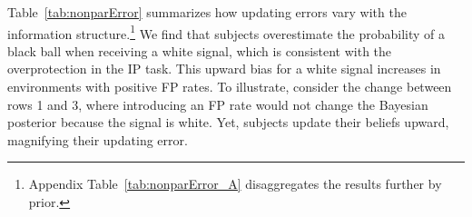 \documentclass[12pt,a4paper]{article}
\begin{document}
\begin{table}[H]\centering 
\caption{Average Updating Error by Signal Type} 
\label{tab:nonparError}
\end{table}



Table~\ref{tab:nonparError} summarizes how updating errors vary with the information structure.\footnote{Appendix Table~\ref{tab:nonparError_A} disaggregates the results further by prior.} We find that subjects overestimate the probability of a black ball when receiving a white signal, which is consistent with the overprotection in the IP task. This upward bias for a white signal increases in environments with positive FP rates. To illustrate, consider the change between rows 1 and 3, where introducing an FP rate would not change the Bayesian posterior because the signal is white. Yet, subjects update their beliefs upward, magnifying their updating error.
\end{document}
